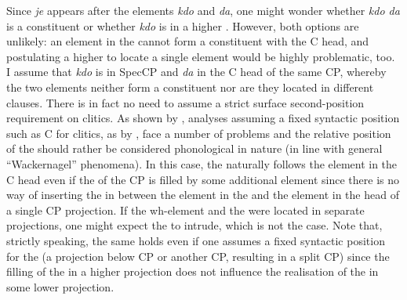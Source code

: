 \documentclass[output=paper,modfonts, hidelinks, newtxmath]{langscibook}
\begin{document}
{\noindent Since \textit{je} appears after the elements \textit{kdo} and \textit{da}, one might wonder whether \textit{kdo da} is a constituent or whether \textit{kdo} is in a higher . However, both options are unlikely: an element in the  cannot form a constituent with the C head, and postulating a higher  to locate a single element would be highly problematic, too. I assume that \textit{kdo} is in SpecCP and \textit{da} in the C head of the same CP, whereby the two elements neither form a constituent nor are they located in different clauses. There is in fact no need to assume a strict surface second-position requirement on  clitics. As shown by \citet{marusic2008}, analyses assuming a fixed syntactic position such as C for clitics, as by \citet{goldenmilojevicsheppard2000}, face a number of problems and the relative position of the  should rather be considered phonological in nature (in line with general ``Wackernagel'' phenomena). In this case, the  naturally follows the element in the C head even if the  of the CP is filled by some additional element since there is no way of inserting the  in between the element in the  and the element in the head of a single CP projection. If the wh-element and the   were located in separate projections, one might expect the  to intrude, which is not the case. Note that, strictly speaking, the same holds even if one assumes a fixed syntactic position for the  (a projection below CP or another CP, resulting in a split CP) since the filling of the  in a higher projection does not influence the realisation of the  in some lower projection.}

\ea
	\z
\z
\end{document}
